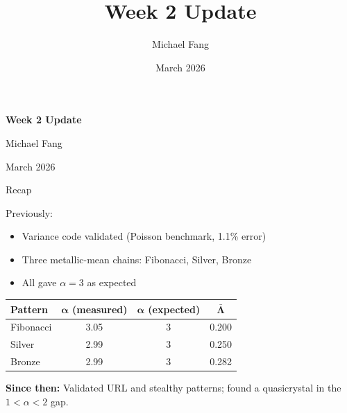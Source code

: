 \documentclass[aspectratio=169, 11pt]{beamer}
\title{Week 2 Update}
\author{Michael Fang}
\date{March 2026}
\begin{document}
\begin{frame}
\centering
\vspace{2em}
{\Large\textbf{Week 2 Update}}

\vspace{1em}
Michael Fang

\vspace{0.5em}
March 2026
\end{frame}

\begin{frame}{Recap}

Previously:
\begin{itemize}
    \item Variance code validated (Poisson benchmark, 1.1\% error)
    \item Three metallic-mean chains: Fibonacci, Silver, Bronze
    \item All gave $\alpha = 3$ as expected
\end{itemize}

\vspace{0.5em}
\begin{table}
\centering
\begin{tabular}{lccc}
\toprule
\textbf{Pattern} & $\boldsymbol{\alpha}$ (measured) & $\boldsymbol{\alpha}$ (expected) & $\boldsymbol{\bar{\Lambda}}$ \\
\midrule
Fibonacci & 3.05 & 3 & 0.200 \\
Silver & 2.99 & 3 & 0.250 \\
Bronze & 2.99 & 3 & 0.282 \\
\bottomrule
\end{tabular}
\end{table}

\vspace{0.5em}
\textbf{Since then:} Validated URL and stealthy patterns; found a quasicrystal in the $1 < \alpha < 2$ gap.
\end{frame}
\end{document}
